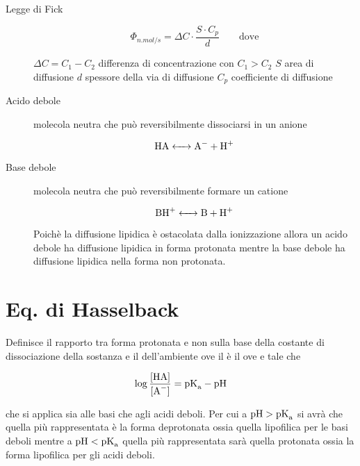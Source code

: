 
\begin{description}
\item[Legge di Fick]
$$ \Phi_{n.mol/s} = \Delta C \cdot \frac{S\cdot C_p}{d} \qquad\text{dove}$$

$\Delta C = C_1 - C_2$ differenza di concentrazione con $C_1 > C_2$\newline
$S$ area di diffusione\newline
$d$ spessore della via di diffusione\newline
$C_p$ coefficiente di diffusione

\item[Acido debole] molecola neutra che può reversibilmente dissociarsi in un anione 

$$\ce{HA <-> A- + H+}$$

\item[Base debole] molecola neutra che può reversibilmente formare un catione

$$\ce{BH+ <-> B + H+}$$

Poichè la diffusione lipidica è ostacolata dalla ionizzazione allora un acido debole ha diffusione lipidica in forma protonata mentre la base debole ha diffusione lipidica nella forma non protonata.

\end{description}

\section{Eq. di Hasselback}

Definisce il rapporto tra forma protonata e non sulla base della costante di dissociazione  della sostanza e il  dell'ambiente ove il  è il  ove \ce{[HA] = [A-]} e tale che

$$\log\frac{\ce{[HA]}}{\ce{[A^-]}} = \ce{pK_a} - \ce{pH}$$

che si applica sia alle basi che agli acidi deboli. Per cui a $\ce{pH} > \ce{pK_a}$ si avrà che quella più rappresentata è la forma deprotonata ossia quella lipofilica per le basi deboli mentre a $\ce{pH} < \ce{pK_a}$ quella più rappresentata sarà quella protonata ossia la forma lipofilica per gli acidi deboli.



